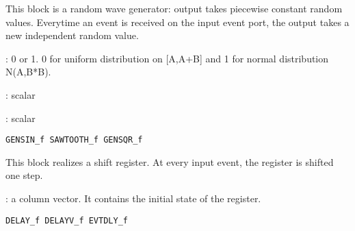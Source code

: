 This block is a random wave generator: output takes piecewise
constant random values. Everytime an event is received on the 
input event port, the output takes a new independent random value.
\begin{scitem}
\item[{\verb?flag?}]
: 0 or 1. 0 for uniform distribution on [A,A+B] and 1 for normal
distribution N(A,B*B).
\item[{\verb?A?}]
: scalar
\item[{\verb?B?}]
: scalar
\end{scitem}%
{\verb?GENSIN_f SAWTOOTH_f GENSQR_f?} \pageref{GENSINfSAWTOOTHfGENSQRf}







%
%


\label{REGISTERf}

This block realizes a shift register. At every input event, the
register is shifted one step.
\begin{scitem}
\item[{\verb?Initial condition?}]
: a column vector. It contains the initial state of the register.
\end{scitem}%
{\verb?DELAY_f DELAYV_f EVTDLY_f?} \pageref{DELAYfDELAYVfEVTDLYf}







%
%


\label{RFILEf}

